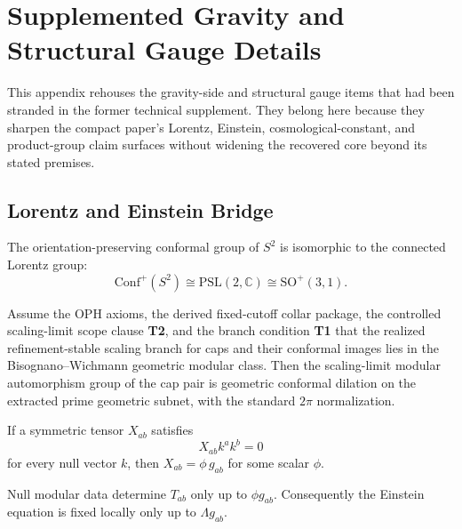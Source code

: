 \section{Supplemented Gravity and Structural Gauge Details}
\label{app:compact-technical-port}

This appendix rehouses the gravity-side and structural gauge items that had been stranded in the
former technical supplement. They belong here because they sharpen the compact paper's Lorentz,
Einstein, cosmological-constant, and product-group claim surfaces without widening the recovered
core beyond its stated premises.

\subsection{Lorentz and Einstein Bridge}

\begin{theorem}
The orientation-preserving conformal group of \(S^2\) is isomorphic to the connected Lorentz
group:
\[
\mathrm{Conf}^+(S^2)\cong \mathrm{PSL}(2,\mathbb C)\cong \mathrm{SO}^+(3,1).
\]
\end{theorem}

\begin{theorem}
Assume the OPH axioms, the derived fixed-cutoff collar package, the controlled scaling-limit
scope clause \textbf{T2}, and the branch condition \textbf{T1} that the realized refinement-stable
scaling branch for caps and their conformal images lies in the Bisognano--Wichmann geometric
modular class. Then the scaling-limit modular automorphism group of the cap pair is geometric
conformal dilation on the extracted prime geometric subnet, with the standard \(2\pi\)
normalization.
\end{theorem}

\begin{lemma}
If a symmetric tensor \(X_{ab}\) satisfies
\[
X_{ab}k^ak^b=0
\]
for every null vector \(k\), then \(X_{ab}=\phi\,g_{ab}\) for some scalar \(\phi\).
\end{lemma}

\begin{corollary}
Null modular data determine \(T_{ab}\) only up to \(\phi g_{ab}\). Consequently the Einstein
equation is fixed locally only up to \(\Lambda g_{ab}\).
\end{corollary}

